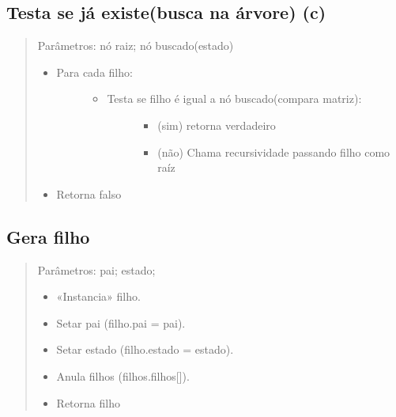 \documentclass[letterpaper,10pt,openany,oneside,portuges]{sphinxmanual}
\begin{document}
\subsection{Testa se já existe(busca na árvore) (c)}
\label{\detokenize{pseudo:testa-se-ja-existe-busca-na-arvore-c}}\begin{quote}

Parâmetros: nó raiz; nó buscado(estado)
\begin{itemize}
\item {} \begin{description}
\item[{Para cada filho:}] \leavevmode\begin{itemize}
\item {} \begin{description}
\item[{Testa se filho é igual a nó buscado(compara matriz):}] \leavevmode\begin{itemize}
\item {} 
(sim) retorna verdadeiro

\item {} 
(não) Chama recursividade passando filho como raíz

\end{itemize}

\end{description}

\end{itemize}

\end{description}

\item {} 
Retorna falso

\end{itemize}
\end{quote}


\subsection{Gera filho}
\label{\detokenize{pseudo:gera-filho}}\begin{quote}

Parâmetros: pai; estado;
\begin{itemize}
\item {} 
«Instancia» filho.

\item {} 
Setar pai (filho.pai = pai).

\item {} 
Setar estado (filho.estado = estado).

\item {} 
Anula filhos (filhos.filhos{[}{]}).

\item {} 
Retorna filho

\end{itemize}
\end{quote}
\end{document}
